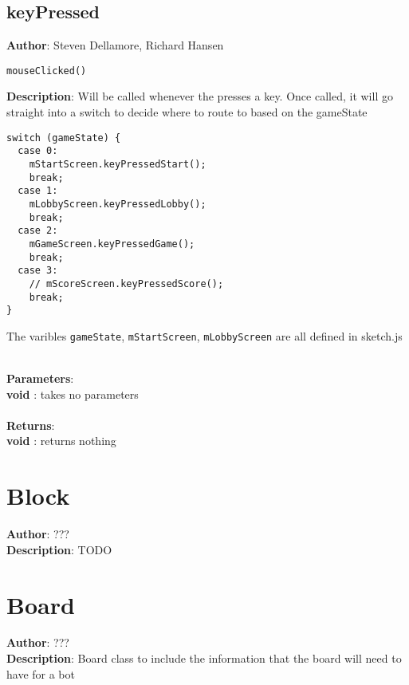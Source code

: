 \documentclass[12pt]{article}
\begin{document}
\subsection{keyPressed}
\textbf{Author}: Steven Dellamore, Richard Hansen 
\vspace*{1\baselineskip}
\begin{lstlisting}
mouseClicked()
\end{lstlisting} 
\vspace*{1\baselineskip}
\textbf{Description}: Will be called whenever the presses a key. Once called, it will go straight into a switch to decide where to route to based on the gameState 
\begin{verbatim}
switch (gameState) {
  case 0:
    mStartScreen.keyPressedStart();
    break;
  case 1:
    mLobbyScreen.keyPressedLobby();
    break;
  case 2:
    mGameScreen.keyPressedGame();
    break;
  case 3:
    // mScoreScreen.keyPressedScore();
    break;
}
\end{verbatim}
 The varibles \texttt{gameState}, \texttt{mStartScreen}, \texttt{mLobbyScreen} are all defined in sketch.js 


\textbf{\large{\\Parameters}}:\\
\textbf{void }: takes no parameters\\\textbf{\large{\\Returns}}:\\
\textbf{void }: returns nothing\\

\section{Block}
\textbf{Author}: ??? \\
\textbf{Description}: TODO \\



\section{Board}
\textbf{Author}: ??? \\
\textbf{Description}: Board class to include the information that the board will need to have for a bot \\
\end{document}
